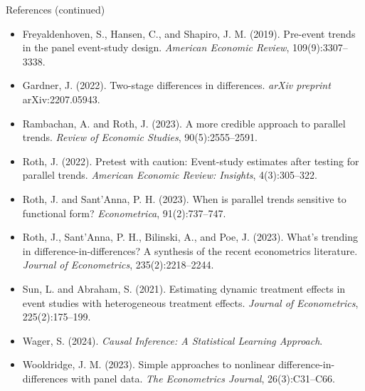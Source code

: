 \documentclass[11pt,aspectratio=169]{beamer}
\begin{document}
\begin{frame}{References (continued)}
\scriptsize
\begin{itemize}
  \item Freyaldenhoven, S., Hansen, C., and Shapiro, J. M. (2019). Pre-event trends in the panel event-study design. \emph{American Economic Review}, 109(9):3307--3338.
  \item Gardner, J. (2022). Two-stage differences in differences. \emph{arXiv preprint} arXiv:2207.05943.
  \item Rambachan, A. and Roth, J. (2023). A more credible approach to parallel trends. \emph{Review of Economic Studies}, 90(5):2555--2591.
  \item Roth, J. (2022). Pretest with caution: Event-study estimates after testing for parallel trends. \emph{American Economic Review: Insights}, 4(3):305--322.
  \item Roth, J. and Sant'Anna, P. H. (2023). When is parallel trends sensitive to functional form? \emph{Econometrica}, 91(2):737--747.
  \item Roth, J., Sant'Anna, P. H., Bilinski, A., and Poe, J. (2023). What's trending in difference-in-differences? A synthesis of the recent econometrics literature. \emph{Journal of Econometrics}, 235(2):2218--2244.
  \item Sun, L. and Abraham, S. (2021). Estimating dynamic treatment effects in event studies with heterogeneous treatment effects. \emph{Journal of Econometrics}, 225(2):175--199.
  \item Wager, S. (2024). \emph{Causal Inference: A Statistical Learning Approach}.
  \item Wooldridge, J. M. (2023). Simple approaches to nonlinear difference-in-differences with panel data. \emph{The Econometrics Journal}, 26(3):C31--C66.
\end{itemize}
\end{frame}
\end{document}
